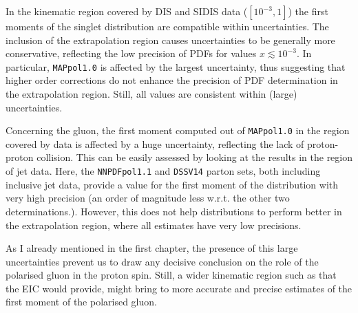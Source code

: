 In the kinematic region covered by DIS and SIDIS data ($[10^{-3}, 1]$) the first moments of the singlet distribution are compatible within uncertainties. The inclusion of the extrapolation region causes uncertainties to be generally more conservative, reflecting the low precision of PDFs for values $x \lesssim 10^{-3}$. In particular, \texttt{MAPpol1.0} is affected by the largest uncertainty, thus suggesting that higher order corrections do not enhance the precision of PDF determination in the extrapolation region. Still, all values are consistent within (large) uncertainties.%

Concerning the gluon, the first moment computed out of \texttt{MAPpol1.0} in the region covered by data is affected by a huge uncertainty, reflecting the lack of proton-proton collision. This can be easily assessed by looking at the results in the region of jet data. Here, the \texttt{NNPDFpol1.1} and \texttt{DSSV14} parton sets, both including inclusive jet data, provide a value for the first moment of the distribution with very high precision (an order of magnitude less w.r.t. the other two determinations.). However, this does not help distributions to perform better in the extrapolation region, where all estimates have very low precisions.%

As I already mentioned in the first chapter, the presence of this large uncertainties prevent us to draw any decisive conclusion on the role of the polarised gluon in the proton spin. Still, a wider kinematic region such as that the EIC would provide, might bring to more accurate and precise estimates of the first moment of the polarised gluon.%